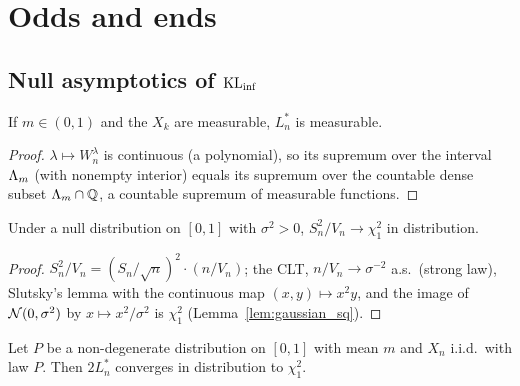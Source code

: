 \chapter{Odds and ends}
\label{chap:odds}

\section{\texorpdfstring{Null asymptotics of $\operatorname{KL}_{\inf}$}{Null asymptotics of KLinf}}

\begin{lemma}
  \label{lem:measurable_hindsightLogWealth}
  \leanok
  If $m \in (0,1)$ and the $X_k$ are measurable, $L^*_n$ is measurable.
\end{lemma}

\begin{proof}
  \leanok
  $\lambda \mapsto W^\lambda_n$ is continuous (a polynomial), so its supremum over the interval
  $\Lambda_m$ (with nonempty interior) equals its supremum over the countable dense subset
  $\Lambda_m \cap \mathbb Q$, a countable supremum of measurable functions.
\end{proof}

\begin{lemma}
  \label{lem:chisq_sq_div}
  \leanok
  Under a null distribution on $[0,1]$ with $\sigma^2 > 0$, $S_n^2/V_n \to \chi^2_1$ in
  distribution.
\end{lemma}

\begin{proof}
  \leanok
  $S_n^2/V_n = (S_n/\sqrt n)^2 \cdot (n / V_n)$; the CLT, $n/V_n \to \sigma^{-2}$ a.s.\ (strong law),
  Slutsky's lemma with the continuous map $(x, y) \mapsto x^2 y$, and the image of
  $\mathcal{N}(0, \sigma^2)$ by $x \mapsto x^2/\sigma^2$ is $\chi^2_1$ (Lemma~\ref{lem:gaussian_sq}).
\end{proof}

\begin{theorem}
  \label{thm:chisq_klinf}
  \leanok
  Let $P$ be a non-degenerate distribution on $[0,1]$ with mean $m$ and $X_n$ i.i.d.\ with law $P$.
  Then $2 L^*_n$ converges in distribution to $\chi^2_1$.
\end{theorem}

